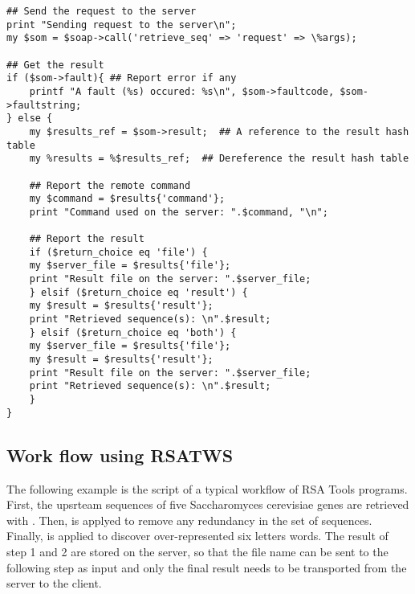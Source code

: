 \begin{footnotesize}
\begin{verbatim}
## Send the request to the server
print "Sending request to the server\n";
my $som = $soap->call('retrieve_seq' => 'request' => \%args);

## Get the result
if ($som->fault){ ## Report error if any
    printf "A fault (%s) occured: %s\n", $som->faultcode, $som->faultstring;
} else {
    my $results_ref = $som->result;  ## A reference to the result hash table
    my %results = %$results_ref;  ## Dereference the result hash table

    ## Report the remote command
    my $command = $results{'command'};
    print "Command used on the server: ".$command, "\n";

    ## Report the result
    if ($return_choice eq 'file') {
	my $server_file = $results{'file'};
	print "Result file on the server: ".$server_file;
    } elsif ($return_choice eq 'result') {
	my $result = $results{'result'};
	print "Retrieved sequence(s): \n".$result;
    } elsif ($return_choice eq 'both') {
	my $server_file = $results{'file'};
	my $result = $results{'result'};
	print "Result file on the server: ".$server_file;
	print "Retrieved sequence(s): \n".$result;
    }
}
\end{verbatim}
\end{footnotesize}

\subsection{Work flow using RSATWS}

The following example is the script of a typical workflow of RSA Tools
programs. First, the upsrteam sequences of five Saccharomyces
cerevisiae genes are retrieved with . Then,
 is applyed to remove any redundancy in the
set of sequences. Finally,  is applied to
discover over-represented six letters words. The result of step 1 and
2 are stored on the server, so that the file name can be sent to the
following step as input and only the final result needs to be
transported from the server to the client.

